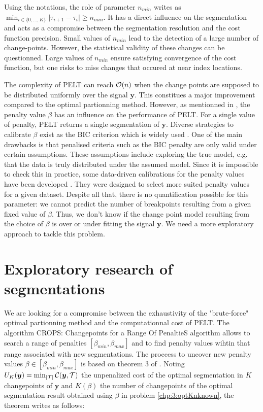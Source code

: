 Using the notations, the role of parameter $n_{min}$ writes as $\min_{i \in \{0,\dots,K\}}\lvert\tau_{i+1}-\tau_{i}\rvert \geq n_{min}$. It has a direct influence on the segmentation and acts as a compromise between the segmentation resolution and the cost function precision. Small values of $n_{min}$ lead to the detection of a large number of change-points. However, the statistical validity of these changes can be questionned. Large values of $n_{min}$ ensure satisfying convergence of the cost function, but one risks to miss changes that occured at near index locations.  
  
The complexity of PELT can reach ${\mathcal O}(n)$ when the change points are supposed to be distributed uniformly over the signal $\bm y$. This constitues a major improvement compared to the optimal partionning method. However, as mentionned in \cite{Haynes2016}, the penalty value $\beta$ has an influence on the performance of PELT. For a single value of penalty, PELT returns a single segmentation of $\bm y$. Diverse strategies to calibrate $\beta$ exist as the BIC criterion which is widely used \citep{YAO1988181,faure2016comparison,Shi2022}. 
One of the main drawbacks is that penalised criteria such as the BIC penalty are only valid under certain assumptions. These assumptions include exploring the true model, e.g. that the data is truly distributed under the assumed model. Since it is impossible to check this in practice, some data-driven calibrations for the penalty values have been developed \citep{Birge2006,Baudry2011,Bardet2012,arlot2009data}. They were designed to select more suited penalty values for a given dataset. Despite all that, there is no quantification possible for this parameter: we cannot predict the number of breakpoints resulting from a given fixed value of $\beta$. Thus, we don't know if the change point model resulting from the choice of $\beta$ is over or under fitting the signal $\bm y$. We need a more exploratory approach to tackle this problem.   

\section{Exploratory research of segmentations}\label{chp:3:3}

We are looking for a compromise between the exhaustivity of the "brute-force" optimal partionning method and the computationnal cost of PELT. The algorithm CROPS: Changepoints for a Range Of PenaltieS algorithm \citep{haynes2017} allows to search a range of penalties $[\beta_{min},\beta_{max}]$ and to find penalty values wihtin that range associated with new segmentations. The proccess to uncover new penalty values $\beta \in [\beta_{min},\beta_{max}]$ is based on theorem 3 of \cite{haynes2017}. Noting $U_K(\bm y) = \min_{\lvert{\mathcal T}\rvert} {\mathcal C}(\bm y,{\mathcal T})$ the unpenalized cost of the optimal segmentation in $K$ changepoints of $\bm y$ and $K(\beta)$ the number of changepoints of the optimal segmentation result obtained using $\beta$ in problem \ref{chp:3:optKnknown}, the theorem writes as follows:

